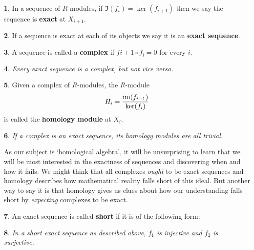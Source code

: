 \documentclass[oneside,english]{amsbook}
\numberwithin{section}{chapter}
\theoremstyle{plain}
\newtheorem{thm}{\protect\theoremname}
\theoremstyle{definition}
\newtheorem{defn}[thm]{\protect\definitionname}
\providecommand{\definitionname}{Definition}
\providecommand{\theoremname}{Theorem}
\newcommand{\im}{\text{\upshape{im}}}
\begin{document}
		\begin{defn}
			In a sequence of $R$-modules, if $\Im(f_i) = \ker(f_{i+1})$ then we say the sequence is \textbf{exact} at $X_{i+1}$.
		\end{defn}

		\begin{defn}
			If a sequence is exact at each of its objects we say it is an \textbf{exact sequence}.
		\end{defn}
		
		\begin{defn}
			A sequence is called a \textbf{complex} if $f{i+1}\circ f_i = 0$ for every $i$.
		\end{defn}
		
		\begin{thm}
			Every exact sequence is a complex, but not \textit{vice versa}.
		\end{thm}
		
		\begin{defn}
			Given a complex of $R$-modules, the $R$-module
			\[
				H_i = \frac{\im(f_{i-1})}{\ker(f_{i})}
			\]
			is called the \textbf{homology module} at $X_i$.
		\end{defn}
		
		\begin{thm}
			If a complex is an exact sequence, its homology modules are all trivial.
		\end{thm}
		
		As our subject is `homological algebra', it will be unsurprising to learn that we will be most interested in the exactness of sequences and discovering when and how it fails. We might think that all complexes \textit{ought} to be exact sequences and homology describes how mathematical reality falls short of this ideal. But another way to say it is that homology gives us clues about how our understanding falls short by \textit{expecting} complexes to be exact.
		
		\begin{defn}
			An exact sequence is called \textbf{short} if it is of the following form:
			\begin{center}
			\end{center}					
		\end{defn}
		
		\begin{thm}
			In a short exact sequence as described above, $f_1$ is injective and $f_{2}$ is surjective.

			\begin{center}
			\end{center}
			
		\end{thm}
		
\end{document}
